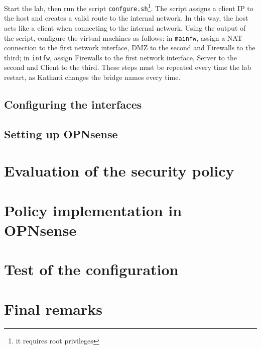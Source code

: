 \documentclass[draft]{homework}
\newcommand{\intfw}{\texttt{intfw}\xspace}
\newcommand{\kat}{Kathará\xspace}
\newcommand{\mainfw}{\texttt{mainfw}\xspace}
\newcommand{\opn}{OPNsense\xspace}
\begin{document}
    Start the lab, then run the script \texttt{confgure.sh}\footnote{it requires root privileges}. The script assigns a client IP to the host and creates a valid route to the internal network. In this way, the host acts like a client when connecting to the internal network. Using the output of the script, configure the virtual machines as follows: in \mainfw, assign a NAT connection to the first network interface, DMZ to the second and Firewalls to the third; in \intfw, assign Firewalls to the first network interface, Server to the second and Client to the third. These steps must be repeated every time the lab restart, as \kat changes the bridge names every time.
    
    \subsection{Configuring the interfaces}
    
    \subsection{Setting up \opn}
    
    
    \section{Evaluation of the security policy}
    
    
    \section{Policy implementation in \opn}
    
    
    \section{Test of the configuration}
    
    \section{Final remarks}
\end{document}

